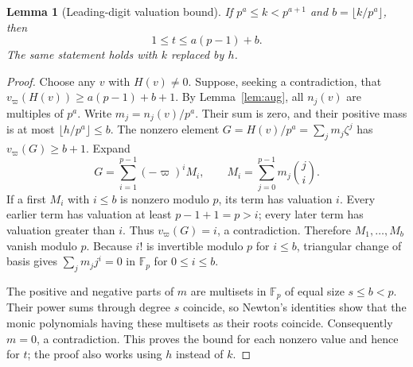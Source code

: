 \documentclass[11pt]{article}
\newtheorem{lemma}[theorem]{Lemma}
\theoremstyle{remark}\newtheorem{remark}[theorem]{Remark}
\newcommand{\F}{\mathbb F}
\newcommand{\vp}{v_{\varpi}}
\begin{document}
\begin{lemma}[Leading-digit valuation bound]\label{lem:t}
If $p^a\le k<p^{a+1}$ and $b=\lfloor k/p^a\rfloor$, then
\begin{equation}\label{eq:t}
 1\le t\le a(p-1)+b.
\end{equation}
The same statement holds with $k$ replaced by $h$.
\end{lemma}
\begin{proof}
Choose any $v$ with $H(v)\ne0$. Suppose, seeking a contradiction, that $\vp(H(v))\ge a(p-1)+b+1$. By Lemma~\ref{lem:aug}, all $n_j(v)$ are multiples of $p^a$. Write $m_j=n_j(v)/p^a$. Their sum is zero, and their positive mass is at most $\lfloor h/p^a\rfloor\le b$. The nonzero element $G=H(v)/p^a=\sum_j m_j\zeta^j$ has $\vp(G)\ge b+1$. Expand
\[
 G=\sum_{i=1}^{p-1}(-\varpi)^i M_i,
 \qquad M_i=\sum_{j=0}^{p-1}m_j\binom ji.
\]
If a first $M_i$ with $i\le b$ is nonzero modulo $p$, its term has valuation $i$. Every earlier term has valuation at least $p-1+1=p>i$; every later term has valuation greater than $i$. Thus $\vp(G)=i$, a contradiction. Therefore $M_1,\ldots,M_b$ vanish modulo $p$. Because $i!$ is invertible modulo $p$ for $i\le b$, triangular change of basis gives $\sum_jm_j j^i=0$ in $\F_p$ for $0\le i\le b$.

The positive and negative parts of $m$ are multisets in $\F_p$ of equal size $s\le b<p$. Their power sums through degree $s$ coincide, so Newton's identities show that the monic polynomials having these multisets as their roots coincide. Consequently $m=0$, a contradiction. This proves the bound for each nonzero value and hence for $t$; the proof also works using $h$ instead of $k$.
\end{proof}
\end{document}
